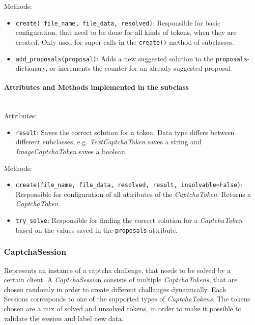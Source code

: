 Methods:

\begin{itemize}
\item \verb|create( file_name, file_data, resolved)|: Responsible for basic configuration, that need to be done for all kinds of tokens, when they are created. Only used for super-calls in the \verb|create()|-method of subclasses.
\item \verb|add_proposals(proposal)|: Adds a new suggested solution to the \verb|proposals|-dictionary, or increments the counter for an already suggested proposal.
\end{itemize}

\paragraph{Attributes and Methods implemented in the subclass} \mbox{} \\



Attributes: 


\begin{itemize}
\item \verb|result|: Saves the correct solution for a token. Data type differs between different subclasses, e.g. \emph{TextCaptchaToken} saves a string and \emph{ImageCaptchaToken} saves a boolean.
\end{itemize}


Methods:


\begin{itemize}
\item \verb|create(file_name, file_data, resolved, result, insolvable=False)|: Responsible for configuration of all attributes of the \emph{CaptchaToken}. Returns a \emph{CaptchaToken}.
\item \verb|try_solve|: Responsible for finding the correct solution for a \emph{CaptchaToken} based on the values saved in the \verb|proposals|-attribute.
\end{itemize}


\subsubsection{CaptchaSession}

Represents an instance of a captcha challenge, that needs to be solved by a certain client. A \emph{CaptchaSessio}n consists of multiple \emph{CaptchaTokens}, that are chosen randomly in order to create different challanges dynamically. Each Sessions corresponds to one of the supported types of \emph{CaptchaTokens}. The tokens chosen are a mix of solved and unsolved tokens, in order to make it possible to validate the session and label new data.


